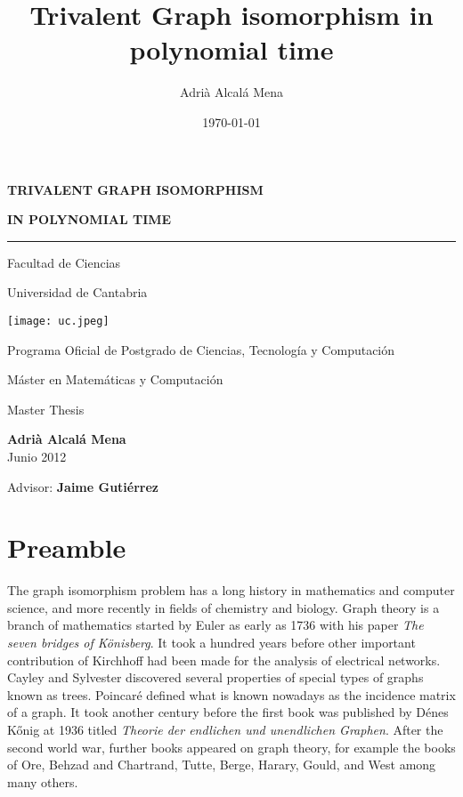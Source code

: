 \documentclass[12pt,a4paper]{book}
\author{Adrià Alcalá Mena}
\title{Trivalent Graph isomorphism in polynomial time}
\date{\today}
\theoremstyle{plain}
\theoremstyle{definition}
\theoremstyle{remark}
\begin{document}
\clearpage{}\thispagestyle{empty}
\vspace*{7mm}
\begin{center}
{\Large\bf TRIVALENT GRAPH ISOMORPHISM }

{\Large\bf IN POLYNOMIAL TIME }\\[5mm]
\hrule

\vspace{10mm}
{\Large Facultad de Ciencias}\vspace*{3mm}

{\Large Universidad de Cantabria}

\vspace{10mm}


\texttt{[image: uc.jpeg]}

\vspace{10mm}

{\large Programa Oficial de Postgrado de
Ciencias, Tecnolog\'ia y Computaci\'on}


{\large Máster en Matem\'aticas y Computaci\'on} \vspace{3mm}

{\large Master Thesis}



{\large\bf Adrià Alcalá Mena}\\[1cm]







{\large Junio 2012}\\[2cm]

\end{center}\vfill

\hfill{\large Advisor: {\bf Jaime Guti\'errez}}
\clearpage{}
 \newpage

\tableofcontents
 \newpage

\chapter*{Preamble}

The graph isomorphism problem has a long history in mathematics and computer science, and more recently in 
fields of chemistry and biology. Graph theory is a branch of mathematics started by Euler as early as 1736 with his paper 
\textit{The seven bridges of Könisberg}. It took a hundred years before other important contribution of Kirchhoff had been 
made for the analysis of electrical networks. Cayley and Sylvester discovered several properties of special types of graphs 
known as trees. Poincaré defined  what is known nowadays as the incidence matrix of a graph. It took another 
century before the first book was published by Dénes Kőnig at 1936 titled \textit{Theorie der endlichen und unendlichen Graphen}. 
After the second world war, further books appeared on graph theory, for example the books of Ore, Behzad and Chartrand, 
Tutte, Berge, Harary, Gould, and West  among many others.
\end{document}
